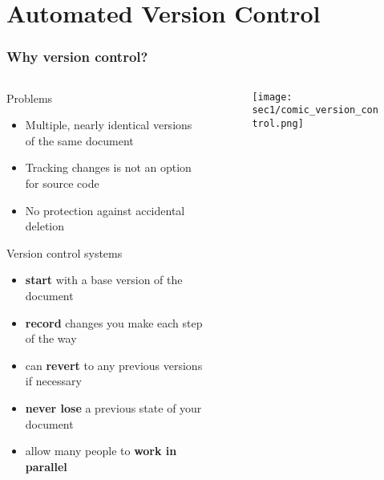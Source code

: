 \section{Automated Version Control}\hypertarget{sec1}{}
\setcounter{framenumber}{0}

\begin{frame}[fragile]
\frametitle{Why version control?}

  \begin{columns}

    \begin{column}{0.6\textwidth}
      Problems
      \begin{itemize}
        \small
        \item Multiple, nearly identical versions of the same document
        \item Tracking changes is not an option for source code
        \item No protection against accidental deletion
      \end{itemize}
      \vspace{0.15cm}
      Version control systems 
      \begin{itemize}
        \small
        \item {\bf start} with a base version of the document
        \item {\bf record} changes you make each step of the way
        \item can {\bf revert} to any previous versions if necessary
        \item {\bf never lose} a previous state of your document
        \item allow many people to {\bf work in parallel}
      \end{itemize}
    \end{column}

    \begin{column}{0.4\textwidth}
    \begin{figure}[h]
    \texttt{[image: sec1/comic\_version\_control.png]}
    \end{figure}
    \end{column}

  \end{columns}

\end{frame}

